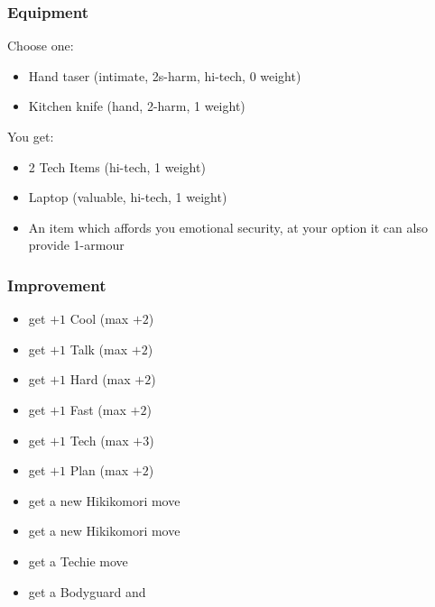 
\subsubsection{Equipment}

Choose one:
\begin{itemize}
\item Hand taser (intimate, 2s-harm, hi-tech, 0 weight)
\item Kitchen knife (hand, 2-harm, 1 weight)
\end{itemize}

You get:
\begin{itemize}
\item 2 Tech Items (hi-tech, 1 weight)
\item Laptop (valuable, hi-tech, 1 weight)
\item An item which affords you emotional security, at your option it can also provide 1-armour
\end{itemize}

\subsubsection{Improvement}
\begin{itemize}
\item get $+1$ Cool (max $+2$)
\item get $+1$ Talk (max $+2$)
\item get $+1$ Hard (max $+2$)
\item get $+1$ Fast (max $+2$)
\item get $+1$ Tech (max $+3$)
\item get $+1$ Plan (max $+2$)
\item get a new Hikikomori move
\item get a new Hikikomori move
\item get a Techie move
\item get a Bodyguard and 
\end{itemize}



